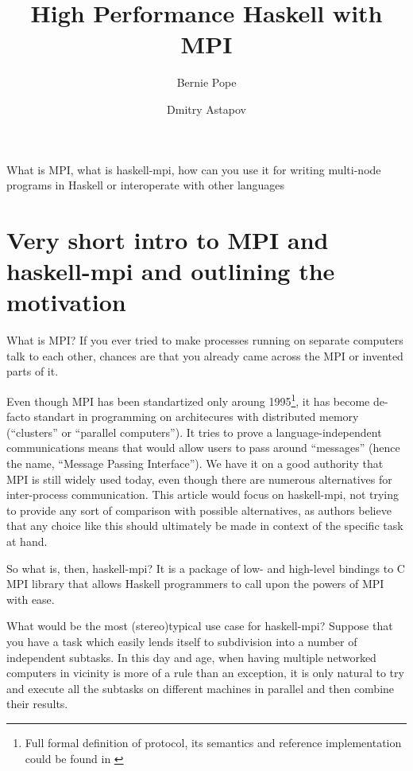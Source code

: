 \documentclass{tmr}
\title{High Performance Haskell with MPI}
\author{Bernie Pope\email{bjpope@unimelb.edu.au}}
\author{Dmitry Astapov\email{dastapov@gmail.com}}
\begin{document}
\begin{introduction} 
What is MPI, what is haskell-mpi, how can you use it for writing multi-node programs in Haskell or interoperate with other languages
\end{introduction}

\section{Very short intro to MPI and haskell-mpi and outlining the motivation}
What is MPI? If you ever tried to make processes running on separate
computers talk to each other, chances are that you already came across
the MPI or invented parts of it. 

Even though MPI has been standartized only aroung 1995\footnote{Full
  formal definition of protocol, its semantics and reference
  implementation could be found in \cite{mpi-report}}, it has become
de-facto standart in programming on architecures with distributed
memory (``clusters'' or ``parallel computers''). It tries to prove a
language-independent communications means that would allow users to
pass around ``messages'' (hence the name, ``Message Passing
Interface''). We have it on a good authority that MPI is still widely
used today, even though there are numerous alternatives for
inter-process communication. This article would focus on haskell-mpi,
not trying to provide any sort of comparison with possible
alternatives, as authors believe that any choice like this should
ultimately be made in context of the specific task at hand.

So what is, then, haskell-mpi? It is a package of low- and high-level bindings
to C MPI library that allows Haskell programmers to call upon the
powers of MPI with ease. 

What would be the most (stereo)typical use case for haskell-mpi?
Suppose that you have a task which easily lends itself to subdivision
into a number of independent subtasks. In this day and age, when
having multiple networked computers in vicinity is more of a rule than
an exception, it is only natural to try and execute all the subtasks
on different machines in parallel and then combine their results.
\end{document}
